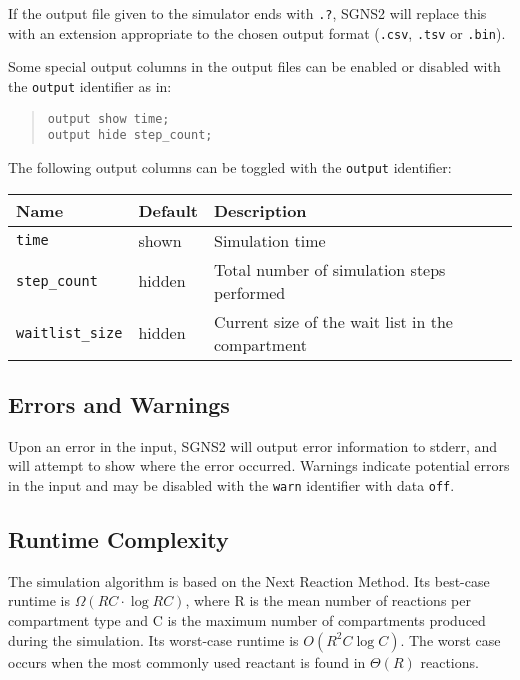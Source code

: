\documentclass[10pt]{article}
\newcommand{\code}[1]{{\tt {#1}}}
\newcommand{\programname}{SGNS2}
\begin{document}
If the output file given to the simulator ends with \code{.?}, {\programname} will replace this with an extension appropriate to the chosen output format (\code{.csv}, \code{.tsv} or \code{.bin}).

Some special output columns in the output files can be enabled or disabled with the \code{output} identifier as in:

\begin{quote}
\code{output show time;}\\
\code{output hide step\_count;}
\end{quote}

The following output columns can be toggled with the \code{output} identifier:

\begin{center}
\begin{tabular}{l|l|p{8cm}}
Name & Default & Description\\
\hline
\code{time} & shown & Simulation time \\
\code{step\_count} & hidden & Total number of simulation steps performed \\
\code{waitlist\_size} & hidden & Current size of the wait list in the compartment \\
\end{tabular}
\end{center}

\subsection{Errors and Warnings}

Upon an error in the input, {\programname} will output error information to stderr, and will attempt to show where the error occurred. Warnings indicate potential errors in the input and may be disabled with the \code{warn} identifier with data \code{off}.

\subsection{Runtime Complexity}

The simulation algorithm is based on the Next Reaction Method. Its best-case runtime is $\Omega(RC\cdot \log RC)$, where R is the mean number of reactions per compartment type and C is the maximum number of compartments produced during the simulation. Its worst-case runtime is $O(R^2C \log C)$. The worst case occurs when the most commonly used reactant is found in $\Theta(R)$ reactions.


\end{document}
